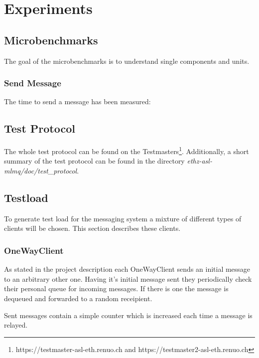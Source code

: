\documentclass[milestone1.tex]{subfiles}
\begin{document}
\section{Experiments}


\subsection{Microbenchmarks}

The goal of the microbenchmarks is to understand single components and units.

\subsubsection{Send Message}

The time to send a message has been measured:




\subsection{Test Protocol}

The whole test protocol can be found on the Testmasters\footnote{https://testmaster-asl-eth.renuo.ch and https://testmaster2-asl-eth.renuo.ch}. Additionally, a short summary of the test protocol can be found in the directory \textit{ethz-asl-mlmq/doc/test\_protocol}.

\subsection{Testload}
To generate test load for the messaging system a mixture of different types of clients will be chosen. This section describes these clients.

\subsubsection{OneWayClient}
As stated in the project description each OneWayClient sends an initial message to an arbitrary other one. Having it's initial message sent they periodically check their personal queue for incoming messages. If there is one the message is dequeued and forwarded to a random receipient.

Sent messages contain a simple counter which is increased each time a message is relayed.
\end{document}
